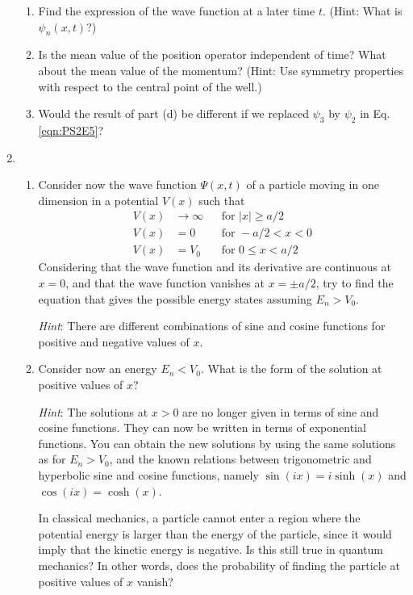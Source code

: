\documentclass[../psets.tex]{subfiles}
\begin{document}
\begin{enumerate}
\begin{enumerate}
        \item Find the expression of the wave function at a later time $t$. (Hint: What is $\psi_n(x,t)$?)
        \item Is the mean value of the position operator independent of time? What about the mean value of the momentum? (Hint: Use symmetry properties with respect to the central point of the well.)
        \item Would the result of part (d) be different if we replaced $\psi_3$ by $\psi_2$ in Eq. \ref{eqn:PS2E5}?
    \end{enumerate}
    \item 
    \begin{enumerate}
        \item Consider now the wave function $\Psi(x,t)$ of a particle moving in one dimension in a potential $V(x)$ such that
        \begin{equation}
            \begin{aligned}
                V(x) &\to\infty && \text{for }|x|\geq a/2\\
                V(x) &= 0       && \text{for }-a/2<x<0\\
                V(x) &= V_0     && \text{for }0\leq x<a/2
            \end{aligned}
        \end{equation}
        Considering that the wave function and its derivative are continuous at $x=0$, and that the wave function vanishes at $x=\pm a/2$, try to find the equation that gives the possible energy states assuming $E_n>V_0$.\par
        \emph{Hint}: There are different combinations of sine and cosine functions for positive and negative values of $x$.
        \item Consider now an energy $E_n<V_0$. What is the form of the solution at positive values of $x$?\par
        \emph{Hint}: The solutions at $x>0$ are no longer given in terms of sine and cosine functions. They can now be written in terms of exponential functions. You can obtain the new solutions by using the same solutions as for $E_n>V_0$, and the known relations between trigonometric and hyperbolic sine and cosine functions, namely $\sin(ix)=i\sinh(x)$ and $\cos(ix)=\cosh(x)$.\par
        In classical mechanics, a particle cannot enter a region where the potential energy is larger than the energy of the particle, since it would imply that the kinetic energy is negative. Is this still true in quantum mechanics? In other words, does the probability of finding the particle at positive values of $x$ vanish?

\end{enumerate}
\end{enumerate}
\end{document}
